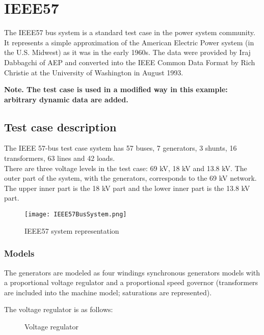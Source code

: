 \documentclass[a4paper, 12pt]{report}
\begin{document}
\chapter{IEEE57}

The IEEE57 bus system is a standard test case in the power system community. It represents a simple approximation of the American Electric Power system (in the U.S. Midwest) as it was in the early 1960s. The data were provided by Iraj Dabbagchi of AEP and converted into the IEEE Common Data Format by Rich Christie at the University of Washington in August 1993.

\textbf{Note. The test case is used in a modified way in this example: arbitrary dynamic data are added.}

\section{Test case description}

The IEEE 57-bus test case system has 57 buses, 7 generators, 3 shunts, 16 transformers, 63 lines and 42 loads.\\
There are three voltage levels in the test case: 69 kV, 18 kV and 13.8 kV. The outer part of the system, with the generators, corresponds to the 69 kV network. The upper inner part is the 18 kV part and the lower inner part is the 13.8 kV part.

\begin{figure}[H]
\texttt{[image: IEEE57BusSystem.png]}
\caption{IEEE57 system representation}
\label{circuit-1}
\end{figure}

\subsection{Models}

The generators are modeled as four windings synchronous generators models with a proportional voltage regulator and a proportional speed governor (transformers are included into the machine model; saturations are represented).

The voltage regulator is as follows:
\begin{figure}[H]
\centering
{}
\caption{Voltage regulator}
\end{figure}
\end{document}
